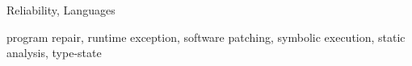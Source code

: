 \documentclass{sigplanconf}
\begin{document}

\terms
Reliability, Languages 

\keywords
program repair, runtime exception, software patching, symbolic execution, static
analysis, type-state











\acks







\end{document}
